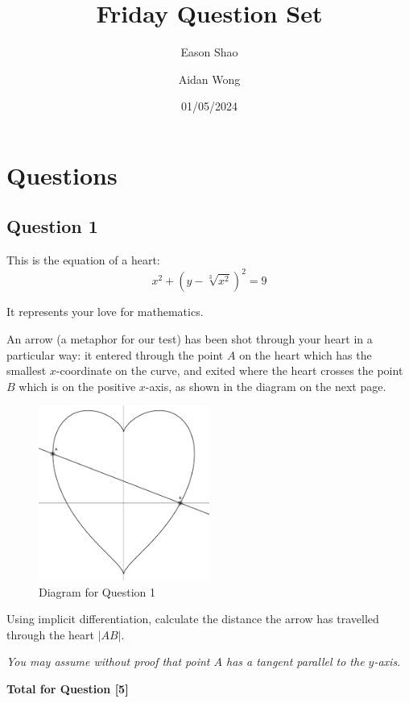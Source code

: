 \documentclass[12pt]{article}
\title{Friday Question Set}
\author{Eason Shao \and Aidan Wong}
\date{01/05/2024}
\begin{document}
    \maketitle

    \section{Questions}
        \subsection{Question 1}
            This is the equation of a heart:
            \[x^{2}+(y-\sqrt[3]{x^{2}})^{2}=9\]
            
            It represents your love for mathematics.

            An arrow (a metaphor for our test) has been shot through your heart in a particular way: it entered through the point \(A\) on the heart which has the smallest \(x\)-coordinate on the curve, and exited where the heart crosses the point \(B\) which is on the positive \(x\)-axis, as shown in the diagram on the next page.

            \begin{figure}
                \centering
                \includegraphics[width = 0.5\textwidth]{Heart.png}
                \caption{Diagram for Question 1}
                \label{fig:Q1Dia}
            \end{figure}
            
            Using implicit differentiation, calculate the distance the arrow has travelled through the heart \(|AB|\).

            \textit{You may assume without proof that point \(A\) has a tangent parallel to the \(y\)-axis}.

            \hfill\textbf{Total for Question [5]}
    
\end{document}
